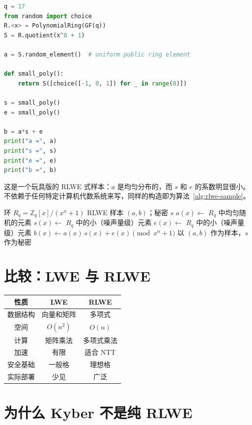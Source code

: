 \begin{lstlisting}[language=Python]
q = 17
from random import choice
R.<x> = PolynomialRing(GF(q))
S = R.quotient(x^8 + 1)

a = S.random_element()  # uniform public ring element

def small_poly():
    return S([choice([-1, 0, 1]) for _ in range(8)])

s = small_poly()
e = small_poly()

b = a*s + e
print("a =", a)
print("s =", s)
print("e =", e)
print("b =", b)
\end{lstlisting}

这是一个玩具版的 RLWE 式样本：$a$ 是均匀分布的，而 $s$ 和 $e$ 的系数明显很小。不依赖于任何特定计算机代数系统来写，同样的构造即为算法~\ref{alg:rlwe-sample}。

\begin{algorithm}[H]
\caption{生成一个 RLWE 样本}
\label{alg:rlwe-sample}
\begin{algorithmic}[1]
\Require 环 $R_q = \mathbb{Z}_q[x]/(x^n+1)$
\Ensure RLWE 样本 $(a,b)$；秘密 $s$
\State $a(x) \gets$ $R_q$ 中均匀随机的元素
\State $s(x) \gets$ $R_q$ 中的小（噪声量级）元素 
\State $e(x) \gets$ $R_q$ 中的小（噪声量级）元素 
\State $b(x) \gets a(x)\,s(x) + e(x) \pmod{x^n+1}$
\State \Return 以 $(a,b)$ 作为样本，$s$ 作为秘密
\end{algorithmic}
\end{algorithm}

\section{比较：LWE 与 RLWE}

\begin{table}[h]
\centering
\begin{tabular}{|c|c|c|}
\hline
性质 & LWE & RLWE \\
\hline
数据结构 & 向量和矩阵 & 多项式 \\
\hline
空间 & $O(n^2)$ & $O(n)$ \\
\hline
计算 & 矩阵乘法 & 多项式乘法 \\
\hline
加速 & 有限 & 适合 NTT \\
\hline
安全基础 & 一般格 & 理想格 \\
\hline
实际部署 & 少见 & 广泛 \\
\hline
\end{tabular}
\end{table}

\section{为什么 Kyber 不是纯 RLWE}

